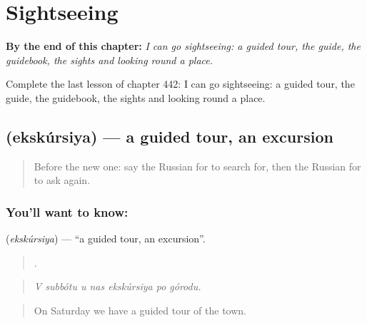 
\chapter{Sightseeing}
\label{ch:ru-sightseeing}

\begin{chapteropening}
\textbf{By the end of this chapter:} \emph{I can go sightseeing: a guided tour, the guide, the guidebook, the sights and looking round a place.}

Complete the last lesson of chapter 442: I can go sightseeing: a guided tour, the guide, the guidebook, the sights and looking round a place.
\end{chapteropening}

\section[\texorpdfstring{\ru{экскурсия} (ekskúrsiya)}{экскурсия (ekskúrsiya)}]{ (ekskúrsiya) — a guided tour, an excursion}

\label{lesson:RU-C442-ekskursiya}



\begin{quote}
Before the new one: say the Russian for to search for, then the Russian for to ask again.
\end{quote}

\subsection*{You'll want to know: }
\textbf{} (\emph{ekskúrsiya}) — \textquotedblleft{}a guided tour, an excursion\textquotedblright{}.

\begin{quote}
      .
\end{quote}

\begin{quote}
\emph{V subbótu u nas ekskúrsiya po górodu.}
\end{quote}

\begin{quote}
On Saturday we have a guided tour of the town.
\end{quote}

